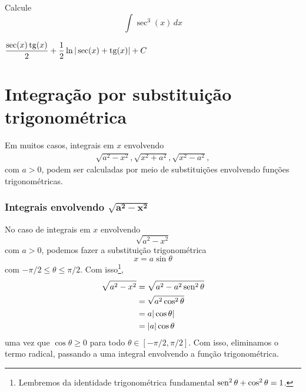 \begin{exer}\label{eq:int_sec3_x}
  Calcule
  \begin{equation}
    \int \sec^3(x)\,dx
  \end{equation}
\end{exer}
\begin{resp}
  $\displaystyle\frac{\sec(x)\operatorname{tg}(x)}{2} + \frac{1}{2}\ln|\sec(x)+\operatorname{tg}(x)| + C$
\end{resp}

\section{Integração por substituição trigonométrica}\label{cap_int_sec_substrigo}

Em muitos casos, integrais em $x$ envolvendo
\begin{gather}
  \sqrt{a^2 - x^2},
  \sqrt{x^2 + a^2},
  \sqrt{x^2 - a^2},
\end{gather}
com $a>0$, podem ser calculadas por meio de substituições envolvendo funções trigonométricas.

\subsubsection{Integrais envolvendo $\pmb{\sqrt{a^2 - x^2}}$}

No caso de integrais em $x$ envolvendo
\begin{equation}
  \sqrt{a^2 - x^2}
\end{equation}
com $a>0$, podemos fazer a substituição trigonométrica
\begin{equation}
  x = a\sin\theta
\end{equation}
com $-\pi/2\leq\theta\leq\pi/2$. Com isso\footnote{Lembremos da identidade trigonométrica fundamental  $\operatorname{sen}^2 \theta + \cos^2 \theta = 1 $.},
\begin{align}
  \sqrt{a^2 - x^2} &= \sqrt{a^2 - a^2\operatorname{sen}^2\theta}\\
                   &= \sqrt{a^2\cos^2\theta}\\
                   &= a|\cos\theta|\\
                   &= |a|\cos\theta
\end{align}
uma vez que $\cos\theta \geq 0$ para todo $\theta\in [-\pi/2,\pi/2]$. Com isso, eliminamos o termo radical, passando a uma integral envolvendo a função trigonométrica.

